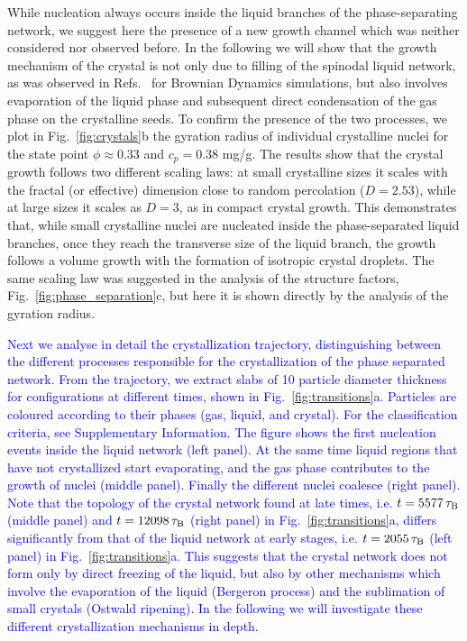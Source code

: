 \documentclass[preprint,amsmath,amssymb,superscriptaddress]{revtex4-1}
\begin{document}
While nucleation always occurs inside the liquid branches of the phase-separating network, we suggest here the presence of a new growth channel
which was neither considered nor observed before. In the following we will show that the growth mechanism of the crystal is not only due to filling of the spinodal liquid network, as was observed in Refs.~\cite{soga1999metastable,fortini2008crystallization,perez2011pathways} for Brownian Dynamics simulations, but also involves 
evaporation of the liquid phase and subsequent direct condensation of the gas phase on the crystalline seeds. 
To confirm the presence of the two processes, we plot in Fig.~\ref{fig:crystals}b the gyration radius of individual crystalline nuclei for the state point 
$\phi\approx 0.33$ and $c_p=0.38$ mg/g. The results show that the crystal growth follows two different scaling laws: at small crystalline sizes it scales with 
the fractal (or effective) dimension close to random percolation ($D=2.53$), while at large sizes it scales as $D=3$, as in compact crystal growth. This demonstrates that, while 
small crystalline nuclei are nucleated inside the phase-separated liquid branches, once they reach the transverse size of the liquid branch, the growth 
follows a volume growth with the formation of isotropic crystal droplets. The same scaling law was suggested in the analysis of the
structure factors, Fig.~\ref{fig:phase_separation}c, but here it is shown directly by the analysis of the gyration radius. 

\textcolor{blue}{Next we analyse in detail the crystallization trajectory, distinguishing between the different processes responsible for the
crystallization of the phase separated network.
From the trajectory, we extract slabs of 10 particle diameter thickness for configurations at different times, shown in Fig.~\ref{fig:transitions}a. 
Particles are coloured according to their phases (gas, liquid, and crystal). For the classification criteria, see Supplementary Information. The figure shows the first nucleation 
events inside the liquid network (left panel). At the same time liquid regions that have not crystallized start evaporating, and the gas phase contributes to the growth of nuclei (middle panel). Finally the different nuclei coalesce (right panel). 
Note that the topology of the crystal network found at late times, i.e. $t=5577\,\tau_{\rm B}$ (middle panel) and $t=12098\,\tau_{\rm B}$ (right panel) in Fig.~\ref{fig:transitions}a, differs significantly from that of the liquid network at early stages, i.e. $t=2055\,\tau_{\rm B}$ (left panel) in Fig.~\ref{fig:transitions}a. This suggests that the crystal network does not form only by direct freezing of the liquid, but also by other mechanisms which involve the evaporation of the liquid (Bergeron process) and the sublimation of small crystals (Ostwald ripening). In the following we will investigate these different crystallization mechanisms in depth.}
 
\end{document}
